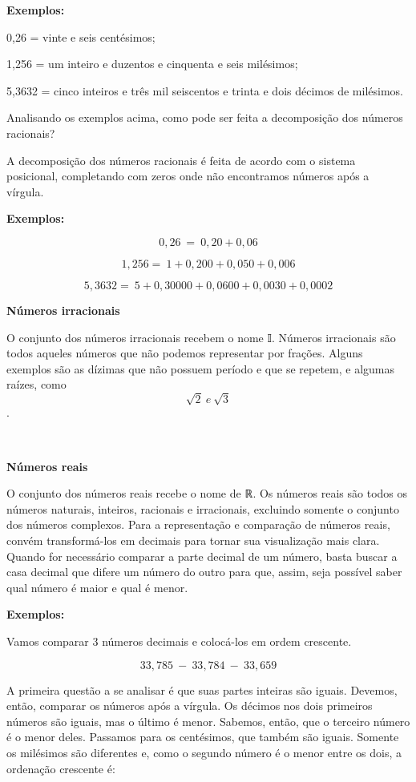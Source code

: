 \textbf{Exemplos:}

0,26 = vinte e seis centésimos;

1,256 = um inteiro e duzentos e cinquenta e seis milésimos;

5,3632 = cinco inteiros e três mil seiscentos e trinta e dois décimos de
milésimos.

Analisando os exemplos acima, como pode ser feita a decomposição dos
números racionais?

A decomposição dos números racionais é feita de acordo com o sistema
posicional, completando com zeros onde não encontramos números após a
vírgula.~

\textbf{Exemplos:}

\[0,26\  = \ 0,20 + 0,06\]

\[1,256 = \ 1 + 0,200 + 0,050 + 0,006\]

\[5,3632 = \ 5 + 0,30000 + 0,0600 + 0,0030 + 0,0002\]

\textbf{Números irracionais}

O conjunto dos números irracionais recebem o nome 𝕀. Números irracionais
são todos aqueles números que não podemos representar por frações.
Alguns exemplos são as dízimas que não possuem período e que se repetem,
e algumas raízes, como \[\sqrt{2} \ e \ \sqrt{3}\].~

~

\textbf{Números reais}

O conjunto dos números reais recebe o nome de ℝ. Os números reais são
todos os números naturais, inteiros, racionais e irracionais, excluindo
somente o conjunto dos números complexos. Para a representação e
comparação de números reais, convém transformá-los em decimais para
tornar sua visualização mais clara. Quando for necessário comparar a
parte decimal de um número, basta buscar a casa decimal que difere um
número do outro para que, assim, seja possível saber qual número é maior
e qual é menor.

\textbf{Exemplos:}

Vamos comparar 3 números decimais e colocá-los em ordem crescente.

\[33,785\  - \ 33,784\  - \ 33,659\]

A primeira questão a se analisar é que suas partes inteiras são iguais.
Devemos, então, comparar os números após a vírgula. Os décimos nos dois
primeiros números são iguais, mas o último é menor. Sabemos, então, que
o terceiro número é o menor deles. Passamos para os centésimos, que
também são iguais. Somente os milésimos são diferentes e, como o segundo
número é o menor entre os dois, a ordenação crescente é:

